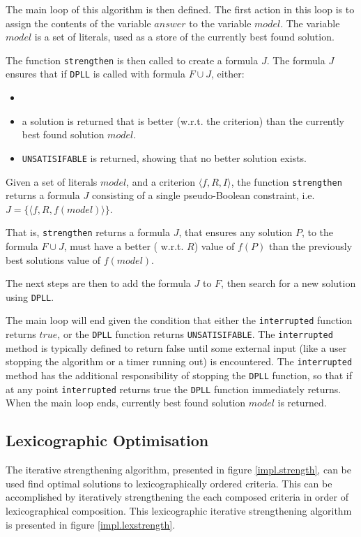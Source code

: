 The main loop of this algorithm is then defined.
The first action in this loop is to assign the contents of the variable $answer$ to the variable $model$.
The variable $model$ is a set of literals, used as a store of the currently best found solution.

The function \texttt{strengthen} is then called to create a formula $J$.
The formula $J$ ensures that if \texttt{DPLL} is called with formula $F \cup J$, either:
\begin{itemize}ula I is used to define the auxiliary variables that are used to represent values
within the problem, but do not alter the problem. Auxiliary variables have been used
before in si
  \item 
  \item a solution is returned that is better (w.r.t. the criterion) than the currently best found solution $model$. 
  \item \texttt{UNSATISIFABLE} is returned, showing that no better solution exists.
\end{itemize}

\begin{defs}
Given a set of literals $model$, and a criterion $\langle f, R, I \rangle$,
the function \texttt{strengthen} returns a formula $J$ consisting of a single pseudo-Boolean constraint, i.e. $ J = \{ \langle f,R,f(model) \rangle \}$.
\end{defs}
That is, \texttt{strengthen} returns a formula $J$,
that ensures any solution $P$, to the formula $F \cup J$, must have a better ( w.r.t. $R$) value of $f(P)$ than the previously best solutions value of $f(model)$.

The next steps are then to add the formula $J$ to $F$, then search for a new solution using \texttt{DPLL}.

The main loop will end given the condition that either the \texttt{interrupted} function returns $true$, or the \texttt{DPLL} function returns \texttt{UNSATISIFABLE}.
The \texttt{interrupted} method is typically defined to return false until some external input (like a user stopping the algorithm or a timer running out) is encountered.
The \texttt{interrupted} method has the additional responsibility of stopping the \texttt{DPLL} function, 
so that if at any point \texttt{interrupted} returns true the \texttt{DPLL} function immediately returns.
When the main loop ends, currently best found solution $model$ is returned.

\subsection{Lexicographic Optimisation}
\label{impl.lexiterstre}
The iterative strengthening algorithm, presented in figure \ref{impl.strength}, can be used find optimal solutions to lexicographically ordered criteria.
This can be accomplished by iteratively strengthening the each composed criteria in order of lexicographical composition.
This lexicographic iterative strengthening algorithm is presented in figure \ref{impl.lexstrength}.

